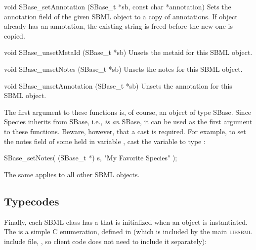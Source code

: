 \documentclass{sbmlmanual}
\newcommand{\libsbml}{\textsc{libsbml}}
\begin{document}
\begin{methoddef}{void SBase\_setAnnotation (SBase\_t *sb, const char *annotation)}
  Sets the annotation field of the given SBML object to a copy of
  annotations.  If object already has an annotation, the existing string
  is freed before the new one is copied.
\end{methoddef}


\begin{methoddef}{void SBase\_unsetMetaId (SBase\_t *sb)}
  Unsets the metaid for this SBML object.
\end{methoddef}


\begin{methoddef}{void SBase\_unsetNotes (SBase\_t *sb)}
  Unsets the notes for this SBML object.
\end{methoddef}


\begin{methoddef}{void SBase\_unsetAnnotation (SBase\_t *sb)}
  Unsets the annotation for this SBML object.
\end{methoddef}


The first argument to these functions is, of course, an object of type
SBase.  Since Species inherits from SBase, i.e., 
\emph{is an} SBase, it can be used as the first argument to these
functions.  Beware, however, that a cast is required.  For example, to set
the notes field of some  held in variable , cast
the variable to type :

\begin{example}[c]
SBase_setNotes( (SBase_t *) s, "My Favorite Species" );
\end{example}

The same applies to all other SBML objects.


\subsection{Typecodes}
\label{sec:typecodes}

Finally, each SBML class has a  that is initialized when
an object is instantiated.  The  is a simple C
enumeration, defined in  (which is included by the
main \libsbml{} include file, , so client code does not
need to include it separately):
\end{document}
